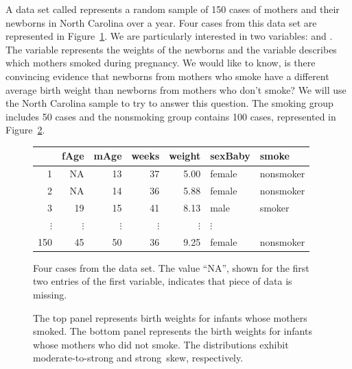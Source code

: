
A data set called  represents a random sample of 150 cases of mothers and their newborns in North Carolina over a year. Four cases from this data set are represented in Figure~\ref{babySmokeDF}. We are particularly interested in two variables:  and . The  variable represents the weights of the newborns and the  variable describes which mothers smoked during pregnancy. We would like to know, is there convincing evidence that newborns from mothers who smoke have a different average birth weight than newborns from mothers who don't smoke? We will use the North Carolina sample to try to answer this question. The smoking group includes 50 cases and the nonsmoking group contains 100 cases, represented in Figure~\ref{babySmokePlotOfTwoGroupsToExamineSkew}.

\begin{figure}[h]
\centering
\begin{tabular}{rrrrrll}
  \hline
 & fAge & mAge & weeks & weight & sexBaby & smoke \\ 
  \hline
1 & NA & 13 &  37 & 5.00 & female & nonsmoker \\ 
  2 & NA & 14 &  36 & 5.88 & female & nonsmoker \\ 
  3 & 19 & 15 &  41 & 8.13 & male & smoker \\ 
  $\vdots$ &   $\vdots$ &   $\vdots$ &   $\vdots$ &   $\vdots$ &   $\vdots$ \\
  150 & 45 & 50 &  36 & 9.25 & female & nonsmoker \\ 
   \hline
\end{tabular}
\caption{Four cases from the  data set. The value ``NA'', shown for the first two entries of the first variable, indicates that piece of data is missing.}
\label{babySmokeDF}
\end{figure}

\begin{figure}[hhh]
  \centering
  \caption{The top panel represents birth weights for infants
      whose mothers smoked.
      The bottom panel represents the birth weights for
      infants whose mothers who did not smoke.
      The distributions exhibit moderate-to-strong and
      strong~skew, respectively.%
      }
  \label{babySmokePlotOfTwoGroupsToExamineSkew}
\end{figure}

